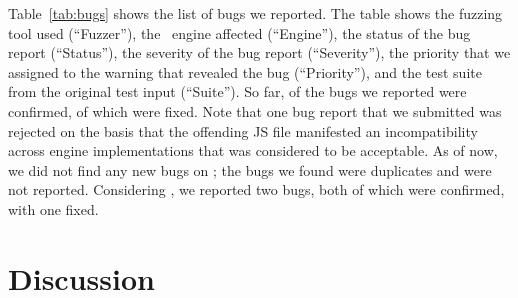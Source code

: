 \documentclass[sigconf,review, anonymous]{acmart}
\begin{document}
Table~\ref{tab:bugs} shows the list of bugs we reported. The table
shows the fuzzing tool used
(``Fuzzer''), the \js\ engine affected (``Engine''), the status of the
bug report (``Status''), the severity of the bug report (``Severity''), the priority
that we assigned to the warning that revealed the bug (``Priority''),
and the test suite from the original test input (``Suite''). So far,
\noDiffConfirmed{} of the bugs we reported were confirmed, \noDiffFixed{} of which
were fixed. Note that one bug report that we submitted was rejected on
the basis that the offending JS file manifested an incompatibility
across engine implementations that was considered to be acceptable. As
of now, we did not find any new bugs on \smonkey{}; the bugs we found
were duplicates and were not reported. Considering \veight{}, we reported two
bugs, both of which were confirmed, with one fixed.





\begin{center}
\end{center}


\section{Discussion}
\label{sec:bugs}
\end{document}
